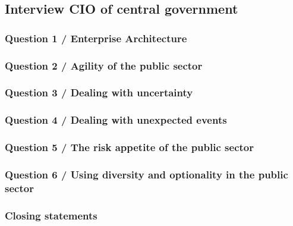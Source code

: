 \subsection{Interview CIO of central government}
\label{sub:interviewciocentral}

\subsubsection{Question 1 / Enterprise Architecture}

\subsubsection{Question 2 / Agility of the public sector}

\subsubsection{Question 3 / Dealing with uncertainty}

\subsubsection{Question 4 / Dealing with unexpected events}

\subsubsection{Question 5 / The risk appetite of the public sector}

\subsubsection{Question 6 / Using diversity and optionality in the public sector}

\subsubsection{Closing statements}